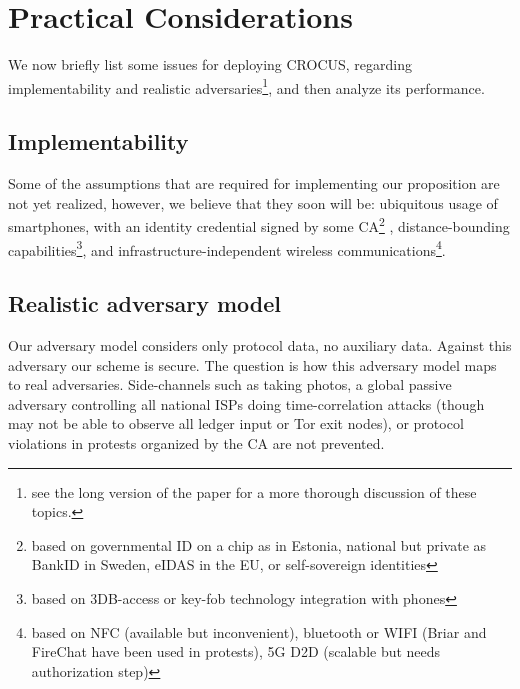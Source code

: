 \section{Practical Considerations}%
\label{Practical}

We now briefly list some issues for deploying
CROCUS, regarding implementability and realistic adversaries\footnote{see the long version of the paper for a more thorough
discussion of these topics. }, and then analyze its performance. 

\subsection{Implementability}

Some of the assumptions that are required for implementing our proposition are 
not yet realized, however, we believe that they soon will be:
ubiquitous usage of smartphones, with an identity credential
signed by some \ac{CA}\footnote{based on \eg governmental ID on a chip as in Estonia, national
  but private as BankID in Sweden, eIDAS in the EU, or self-sovereign
  identities} ,  distance-bounding capabilities\footnote{based on \eg
  3DB-access or key-fob technology integration with phones}, and
infrastructure-independent wireless communications\footnote{based on
  \eg NFC (available but inconvenient), bluetooth or WIFI (Briar and
  FireChat have been used in protests), 5G D2D (scalable but needs
  authorization step)}.

\subsection{Realistic adversary model}
Our adversary model considers only protocol data, no auxiliary data.
Against this adversary our scheme is secure.
The question is how this adversary model maps to real
adversaries. Side-channels such as taking photos, a global passive adversary
controlling all national ISPs doing time-correlation attacks (though
may not be able to observe all ledger input or \eg Tor exit nodes), or
protocol violations in protests organized by the \ac{CA} are
not prevented.

